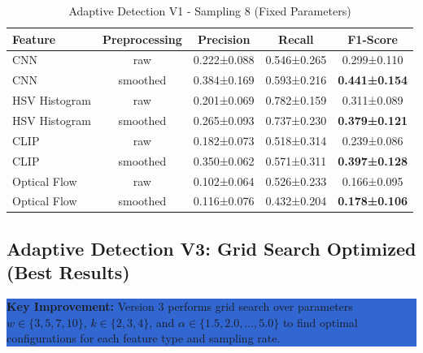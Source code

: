 \documentclass[11pt,a4paper]{article}
\begin{document}
\begin{table}[H]
\centering
\caption{Adaptive Detection V1 - Sampling 8 (Fixed Parameters)}
\label{tab:adaptive_v1_sampling}
\small
\begin{tabular}{lcccc}
\toprule
\textbf{Feature} & \textbf{Preprocessing} & \textbf{Precision} & \textbf{Recall} & \textbf{F1-Score} \\
\midrule
CNN & raw & 0.222±0.088 & 0.546±0.265 & 0.299±0.110 \\
CNN & smoothed & 0.384±0.169 & 0.593±0.216 & \textbf{0.441±0.154} \\
\midrule
HSV Histogram & raw & 0.201±0.069 & 0.782±0.159 & 0.311±0.089 \\
HSV Histogram & smoothed & 0.265±0.093 & 0.737±0.230 & \textbf{0.379±0.121} \\
\midrule
CLIP & raw & 0.182±0.073 & 0.518±0.314 & 0.239±0.086 \\
CLIP & smoothed & 0.350±0.062 & 0.571±0.311 & \textbf{0.397±0.128} \\
\midrule
Optical Flow & raw & 0.102±0.064 & 0.526±0.233 & 0.166±0.095 \\
Optical Flow & smoothed & 0.116±0.076 & 0.432±0.204 & \textbf{0.178±0.106} \\
\bottomrule
\end{tabular}
\end{table}


\subsection{Adaptive Detection V3: Grid Search Optimized (Best Results)}

\colorbox{highlight}{\parbox{\dimexpr\linewidth-2\fboxsep}{%
\textbf{Key Improvement:} Version 3 performs grid search over parameters $w \in \{3,5,7,10\}$, $k \in \{2,3,4\}$, and $\alpha \in \{1.5, 2.0, ..., 5.0\}$ to find optimal configurations for each feature type and sampling rate.
}}

\vspace{0.5em}
\end{document}
